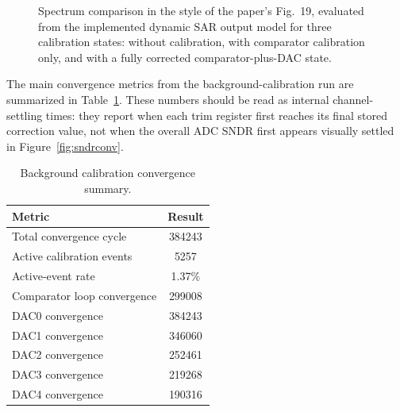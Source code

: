 \documentclass[11pt]{article}
\begin{document}
\begin{figure}[H]
\centering
{}
\caption{Spectrum comparison in the style of the paper's Fig.~19, evaluated from the implemented dynamic SAR output model for three calibration states: without calibration, with comparator calibration only, and with a fully corrected comparator-plus-DAC state.}
\label{fig:spectra}
\end{figure}

The main convergence metrics from the background-calibration run are summarized in Table~\ref{tab:convergence}. These numbers should be read as internal channel-settling times: they report when each trim register first reaches its final stored correction value, not when the overall ADC SNDR first appears visually settled in Figure~\ref{fig:sndrconv}.

\begin{table}[H]
\centering
\caption{Background calibration convergence summary.}
\label{tab:convergence}
\begin{tabular}{lc}
\toprule
Metric & Result \\
\midrule
Total convergence cycle & 384243 \\
Active calibration events & 5257 \\
Active-event rate & 1.37\% \\
Comparator loop convergence & 299008 \\
DAC0 convergence & 384243 \\
DAC1 convergence & 346060 \\
DAC2 convergence & 252461 \\
DAC3 convergence & 219268 \\
DAC4 convergence & 190316 \\
\bottomrule
\end{tabular}
\end{table}
\end{document}
